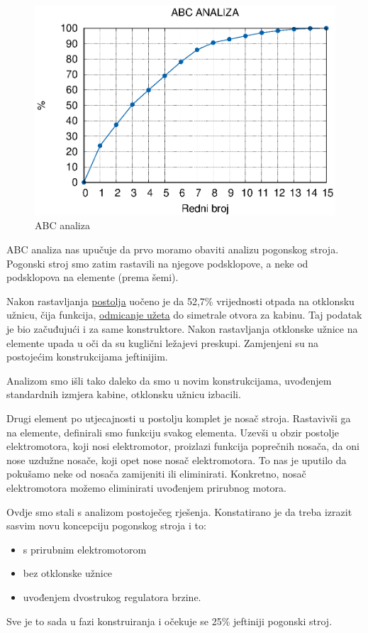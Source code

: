 \documentclass[a4paper,12pt]{article}
\numberwithin{figure}{section}
\begin{document}
\begin{figure}
  \centering
    \includegraphics[width=0.8\paperwidth]{abcAnaliza.eps}
    \caption{ABC analiza}
    \label{analiza}
\end{figure}
\FloatBarrier

ABC analiza nas upučuje da prvo moramo obaviti analizu pogonskog stroja. Pogonski stroj smo zatim rastavili na njegove podsklopove, a neke od podsklopova na elemente (prema šemi).\par
Nakon rastavljanja \underline{postolja} uočeno je da 52,7\% vrijednosti otpada na otklonsku užnicu, čija funkcija, \underline{odmicanje užeta} do simetrale otvora za kabinu. Taj podatak je bio začuđujući i za same konstruktore. Nakon rastavljanja otklonske užnice na elemente upada u oči da su kuglični ležajevi preskupi. Zamjenjeni su na postojećim konstrukcijama jeftinijim.\par
Analizom smo išli tako daleko da smo u novim konstrukcijama, uvođenjem standardnih izmjera kabine, otklonsku užnicu izbacili.\par
Drugi element po utjecajnosti u postolju komplet je nosač stroja. Rastavivši ga na elemente, definirali smo funkciju svakog elementa. Uzevši u obzir postolje elektromotora, koji nosi elektromotor, proizlazi funkcija poprečnih nosača, da oni nose uzdužne nosače, koji opet nose nosač elektromotora. To nas je uputilo da pokušamo neke od nosača zamijeniti ili eliminirati. Konkretno, nosač elektromotora možemo eliminirati uvođenjem prirubnog motora.\par
Ovdje smo stali s analizom postoječeg rješenja. Konstatirano je da treba izrazit sasvim novu koncepciju pogonskog stroja i to:
\begin{itemize}
\item s prirubnim elektromotorom
\item bez otklonske užnice
\item uvođenjem dvostrukog regulatora brzine.
\end{itemize}
Sve je to sada u fazi konstruiranja i očekuje se 25\% jeftiniji pogonski stroj.
\end{document}
